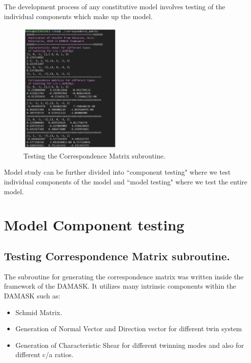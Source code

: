 The development process of any constitutive model involves testing of the individual components which make up the model.

\begin{figure}
 \includegraphics[width=0.45\textwidth]{images/Result_correspondence_matrix.pdf}
 \caption{Testing the Correspondence Matrix subroutine.}
  \label{Correspondence_matrix_program}
\end{figure}



Model study can be further divided into ``component testing" where we test individual components of the model and ``model testing" where we test the entire model.

\section{Model Component testing}

\subsection{Testing Correspondence Matrix subroutine.}

The subroutine for generating the correspondence matrix was written inside the framework of the DAMASK. It utilizes many intrinsic components within the DAMASK such as:

\begin{itemize}
    \item Schmid Matrix.
    \item Generation of Normal Vector and Direction vector for different twin system
    \item Generation of Characteristic Shear for different twinning modes and also for different c/a ratios.
\end{itemize}

